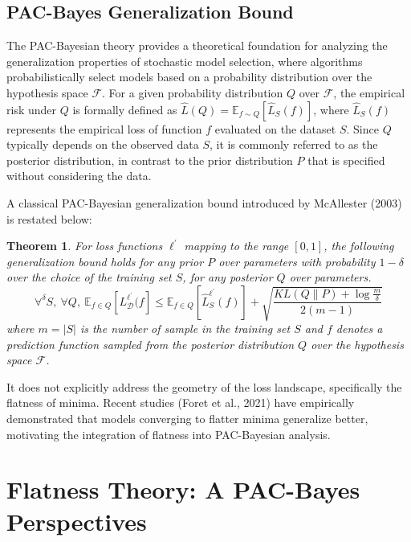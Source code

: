 \documentclass[letterpaper]{article} %
\newtheorem{theorem}{Theorem}
\begin{document}
\subsection{PAC-Bayes Generalization Bound }
The PAC-Bayesian theory provides a theoretical foundation for analyzing the generalization properties of stochastic model selection, where algorithms probabilistically select models based on a probability distribution over the hypothesis space \(\mathcal{F}\). For a given probability distribution \(Q\) over \(\mathcal{F}\), the empirical risk under \(Q\) is formally defined as \(\hat{L}(Q) = \mathbb{E}_{f \sim Q}[\hat{L}_S(f)]\), where \(\hat{L}_S(f)\) represents the empirical loss of function \(f\) evaluated on the dataset \(S\). Since \(Q\) typically depends on the observed data \(S\), it is commonly referred to as the posterior distribution, in contrast to the prior distribution \(P\) that is specified without considering the data. 

A classical PAC-Bayesian generalization bound introduced by McAllester (2003) is restated below:
\begin{theorem} \label{the: PAC1999}
\citep{mcallesterPACBayesianStochasticModel2003}
For loss functions $\ell^{'}$ mapping to the range $[0,1]$, the following generalization bound holds for any prior $P$ over parameters with probability $1 - \delta$ over the choice of the training set $S$, for any posterior $Q$ over parameters.
\begin{equation}\label{eq: PAC2003}
     \forall^{\delta}S,\ \forall Q,\ \mathbb{E}_{f \in Q}[L_{\mathcal{D}}^{\ell^{'}}(f] \leq  \mathbb{E}_{f \in Q}[\hat{L}^{\ell^{'}}_{S}(f)] +\sqrt{\frac{KL(Q\|P)+\log \frac{m}{\delta}}{2(m-1)}}
\end{equation}
where $m=|S|$ is the number of sample in the training set $S$ and $f$ denotes a prediction function sampled from the posterior distribution $Q$ over the hypothesis space $\mathcal{F}$.
\end{theorem}


 It does not explicitly address the geometry of the loss landscape, specifically the flatness of minima. Recent studies (Foret et al., 2021) have empirically demonstrated that models converging to flatter minima generalize better, motivating the integration of flatness into PAC-Bayesian analysis.




\section{Flatness Theory: A PAC-Bayes Perspectives}
\end{document}
